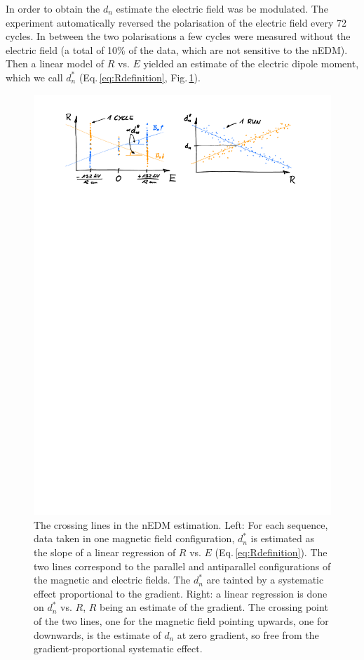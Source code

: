 In order to obtain the $d_n$ estimate the electric field was be modulated. The experiment automatically reversed the polarisation of the electric field every 72 cycles. In between the two polarisations a few cycles were measured without the electric field (a total of 10\% of the data, which are not sensitive to the nEDM). Then a linear model of  $R$ vs. $E$ yielded an estimate of the electric dipole moment, which we call $d_n^*$ (Eq.\,\ref{eq:Rdefinition}, Fig.\,\ref{fig:crossing_lines}).

\begin{figure}
  \centering
  \includegraphics[width=\linewidth]{gfx/nEDMatPSI/crossing_lines.pdf}
  \caption{The crossing lines in the nEDM estimation. Left: For each sequence, data taken in one magnetic field configuration, $d_n^*$ is estimated as the slope of a linear regression of $R$ vs. $E$ (Eq.\,\ref{eq:Rdefinition}). The two lines correspond to the parallel and antiparallel configurations of the magnetic and electric fields. The $d_n^*$ are tainted by a systematic effect proportional to the gradient. Right: a linear regression is done on $d_n^*$ vs. $R$, $R$ being an estimate of the gradient. The crossing point of the two lines, one for the magnetic field pointing upwards, one for downwards, is the estimate of $d_n$ at zero gradient, so free from the gradient-proportional systematic effect.}\label{fig:crossing_lines}
\end{figure}

